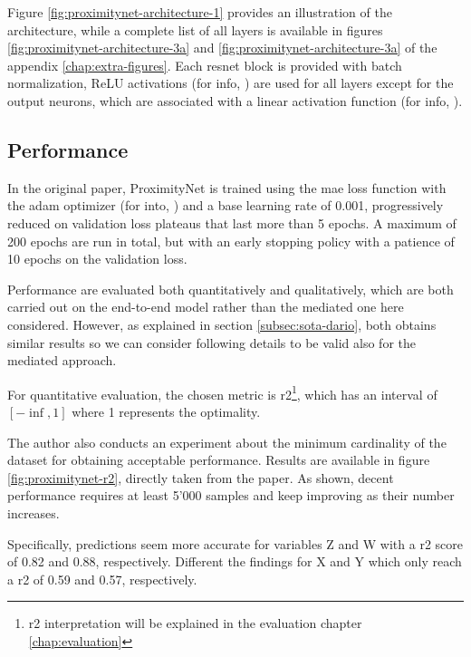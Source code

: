 Figure \ref{fig:proximitynet-architecture-1} provides an illustration of the architecture, while a complete list of all layers is available in figures \ref{fig:proximitynet-architecture-3a} and \ref{fig:proximitynet-architecture-3a} of the appendix \ref{chap:extra-figures}. Each \gls{resnet} block is provided with batch normalization, ReLU activations (for info, \cite{act-relu}) are used for all layers except for the output neurons, which are associated with a linear activation function (for info, \cite{act-linear}). 



\subsection{Performance}
\label{subsec:proximitynet-performance}

In the original paper, ProximityNet is trained using the \gls{mae} loss function with the \gls{adam} optimizer (for into, \cite{kingma2014adam}) and a base learning rate of 0.001, progressively reduced on validation loss plateaus that last more than 5 epochs. A maximum of 200 epochs are run in total, but with an early stopping policy with a patience of 10 epochs on the validation loss. 

Performance are evaluated both quantitatively and qualitatively, which are both carried out on the end-to-end model rather than the mediated one here considered. However, as explained in section \ref{subsec:sota-dario}, both obtains similar results so we can consider following details to be valid also for the mediated approach.

\medskip 

For quantitative evaluation, the chosen metric is \gls{r2}\footnote{\gls{r2} interpretation will be explained in the evaluation chapter \ref{chap:evaluation}}, which has an interval of $[-\inf, 1]$ where 1 represents the optimality. 

The author also conducts an experiment about the minimum cardinality of the dataset for obtaining acceptable performance. Results are available in figure \ref{fig:proximitynet-r2}, directly taken from the paper. As shown, decent performance requires at least 5'000 samples and keep improving as their number increases.

Specifically, predictions seem more accurate for variables Z and W with a \gls{r2} score of 0.82 and 0.88, respectively. Different the findings for X and Y which only reach a \gls{r2} of 0.59 and 0.57, respectively.

